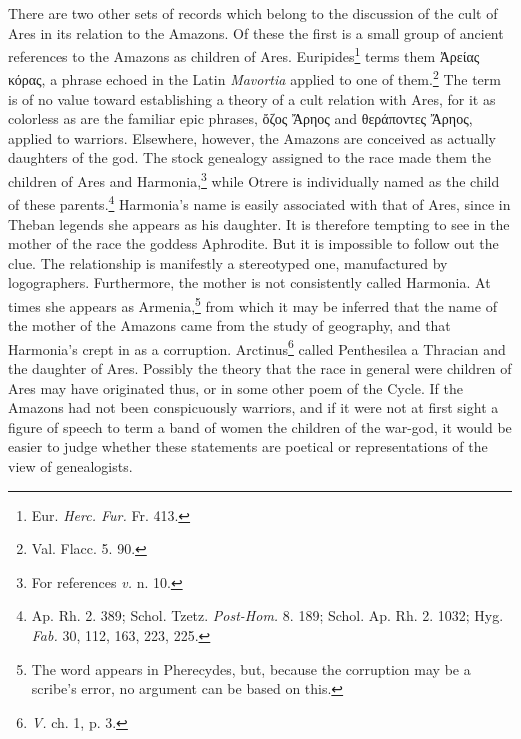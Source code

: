 \documentclass[a4paper, 12pt, oneside]{article}
\begin{document}
There are two other sets of records which belong to the discussion of the cult of Ares in its relation to the Amazons. Of these the first is a small group of ancient references to the Amazons as children of Ares. Euripides\footnote{Eur. \emph{Herc. Fur.} Fr. 413.} terms them Ἀρείας κόρας, a phrase echoed in the Latin \emph{Mavortia} applied to one of them.\footnote{Val. Flacc. 5. 90.} The term is of no value toward establishing a theory of a cult relation with Ares, for it as colorless as are the familiar epic phrases, ὄζος Ἄρηος and θεράποντες Ἄρηος, applied to warriors. Elsewhere, however, the Amazons are conceived as actually daughters of the god. The stock genealogy assigned to the race made them the children of Ares and Harmonia,\footnote{For references \emph{v.} n. 10.} while Otrere is individually named as the child of these parents.\footnote{Ap. Rh. 2. 389; Schol. Tzetz. \emph{Post-Hom.} 8. 189; Schol. Ap. Rh. 2. 1032; Hyg. \emph{Fab.} 30, 112, 163, 223, 225.} Harmonia's name is easily associated with that of Ares, since in Theban legends she appears as his daughter. It is therefore tempting to see in the mother of the race the goddess Aphrodite. But it is impossible to follow out the clue. The relationship is manifestly a stereotyped one, manufactured by logographers. Furthermore, the mother is not consistently called Harmonia. At times she appears as Armenia,\footnote{The word appears in Pherecydes, but, because the corruption may be a scribe's error, no argument can be based on this.} from which it may be inferred that the name of the mother of the Amazons came from the study of geography, and that Harmonia's crept in as a corruption. Arctinus\footnote{\emph{V.} ch. 1, p. 3.} called Penthesilea a Thracian and the daughter of Ares. Possibly the theory that the race in general were children of Ares may have originated thus, or in some other poem of the Cycle. If the Amazons had not been conspicuously warriors, and if it were not at first sight a figure of speech to term a band of women the children of the war-god, it would be easier to judge whether these statements are poetical or representations of the view of genealogists.
\end{document}

